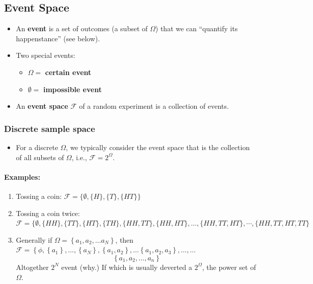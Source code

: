 \subsection{Event Space}
\begin{itemize}
\item An \textbf{event} is a set of outcomes (a subset of \(\Omega\))
   that we can ``quantify its happenstance'' (see below). 
\item Two special events: 
\begin{itemize}
\item \(\Omega =\)  \textbf{certain event} 
\item \(\emptyset =\) \textbf{impossible event}
\end{itemize}
\item An \textbf{event space} \(\mathcal{F}\) of a random experiment
is a collection of events.
\end{itemize}

\subsubsection{Discrete sample space}
\begin{itemize}
\item For a discrete \(\Omega\), we typically consider the event space
that is the collection
of all subsets of \(\Omega\), i.e., \(\mathcal{F} = 2^{\Omega}\).
\end{itemize}

\paragraph{Examples:}
\begin{enumerate}
\item Tossing a coin: \(\mathcal{F} =\{\emptyset,\{H\},\{T\},\{H T\}\}\)
\item Tossing a coin twice:  \(\mathcal{F} =\{\emptyset,\{H H\},\{T T\},\{H T\},\{T H\},
 \{H H, T T\},\{H H, H T\}, \ldots, 
\{H H, T T, H T\}, \cdots,\{H H, T T, H T, T T\}\)

\item Generally if \(\Omega=\left\{a_{1}, a_{2}, \ldots
a_{N}\right\}\), then \(\mathcal{F}=\left\{\phi,\left\{a_{1}\right\},
\ldots,\left\{a_{N}\right\},\left\{a_{1}, a_{2}\right\},
\ldots\left\{a_{1}, a_{2}, a_{3}\right\}, \ldots, \ldots\right.\)
\[
\left\{a_{1}, a_{2}, \ldots, a_{n}\right\}
\]
Altogether \(2^{N}\) event (why.) If which is usually deverted a \(2^{\Omega}\), the power set of \(\Omega\).
\end{enumerate}

